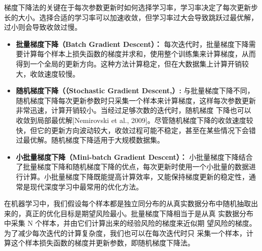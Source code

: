 梯度下降法的关键在于每次参数更新时如何选择学习率，学习率决定了每次更新步长的大小。选择合适的学习率可以加速收敛，但学习率过大会导致跳跃过最优解，过小则会导致收敛过慢。
   
 
 
 \begin{itemize} 
\item  {\bf 批量梯度下降（Batch Gradient Descent）： }每次迭代时，批量梯度下降需要计算每个样本上损失函数的梯度并求和，使用整个训练集来计算梯度，从而得到一个全局的更新方向。这种方法计算稳定，但在大数据集上计算开销较大，收敛速度较慢。
 \item {\bf 随机梯度下降（（Stochastic Gradient Descent,）:}  与批量梯度下降不同，随机梯度下降每次更新参数时只采集一个样本来计算梯度，这样每次参数更新非常迅速，计算开销较小。当经过足够次数的迭代时，随机梯度 下降也可以收敛到局部最优解[Nemirovski et al., 2009]。尽管随机梯度下降的收敛速度较快，但它的更新方向波动较大，收敛过程可能不稳定，甚至在某些情况下会错过最优解。随机梯度下降适用于大规模数据集。
 \item {\bf 小批量梯度下降（Mini-batch Gradient Descent）：} 小批量梯度下降结合了批量梯度下降和随机梯度下降的优点，每次更新时使用一个小批量的数据进行计算。小批量梯度下降既能提高计算效率，又能保持梯度更新的稳定性，通常是现代深度学习中最常用的优化方法。
\end{itemize}

在机器学习中，我们假设每个样本都是独立同分布的从真实数据分布中随机抽取出来的，真正的优化目标是期望风险最小。批量梯度下降相当于是从真 实数据分布中采集 N 个样本，并由它们计算出来的经验风险的梯度来近似期 望风险的梯度。为了减少每次迭代的计算复杂度，我们也可以在每次迭代时只 采集一个样本，计算这个样本损失函数的梯度并更新参数，即随机梯度下降法。

